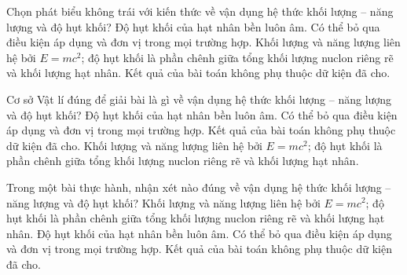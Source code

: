 \begin{ex}
Chọn phát biểu không trái với kiến thức về vận dụng hệ thức khối lượng – năng lượng và độ hụt khối?
\choice
{Độ hụt khối của hạt nhân bền luôn âm.}
{Có thể bỏ qua điều kiện áp dụng và đơn vị trong mọi trường hợp.}
{\True Khối lượng và năng lượng liên hệ bởi $E=mc^2$; độ hụt khối là phần chênh giữa tổng khối lượng nuclon riêng rẽ và khối lượng hạt nhân.}
{Kết quả của bài toán không phụ thuộc dữ kiện đã cho.}
\end{ex}

\begin{ex}
Cơ sở Vật lí đúng để giải bài là gì về vận dụng hệ thức khối lượng – năng lượng và độ hụt khối?
\choice
{Độ hụt khối của hạt nhân bền luôn âm.}
{Có thể bỏ qua điều kiện áp dụng và đơn vị trong mọi trường hợp.}
{Kết quả của bài toán không phụ thuộc dữ kiện đã cho.}
{\True Khối lượng và năng lượng liên hệ bởi $E=mc^2$; độ hụt khối là phần chênh giữa tổng khối lượng nuclon riêng rẽ và khối lượng hạt nhân.}
\end{ex}

\begin{ex}
Trong một bài thực hành, nhận xét nào đúng về vận dụng hệ thức khối lượng – năng lượng và độ hụt khối?
\choice
{\True Khối lượng và năng lượng liên hệ bởi $E=mc^2$; độ hụt khối là phần chênh giữa tổng khối lượng nuclon riêng rẽ và khối lượng hạt nhân.}
{Độ hụt khối của hạt nhân bền luôn âm.}
{Có thể bỏ qua điều kiện áp dụng và đơn vị trong mọi trường hợp.}
{Kết quả của bài toán không phụ thuộc dữ kiện đã cho.}
\end{ex}

